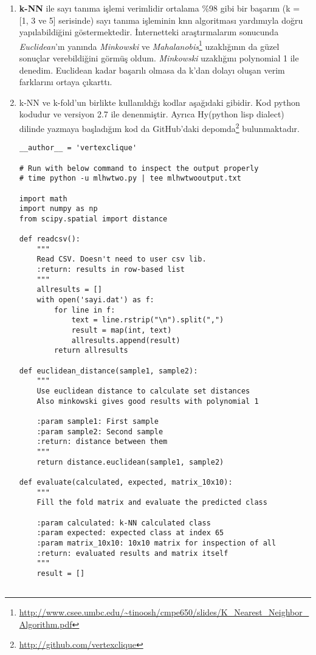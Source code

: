 \documentclass[11pt]{article}
\begin{document}
\begin{enumerate}[\indent a)]

\item
\textbf{k-NN} ile sayı tanıma işlemi verimlidir ortalama \%98 gibi bir başarım (k = [1, 3 ve 5] serisinde) sayı tanıma işleminin knn algoritması yardımıyla doğru yapılabildiğini göstermektedir. İnternetteki araştırmalarım sonucunda \textit{Euclidean}'ın yanında \textit{Minkowski} ve \textit{Mahalanobis}\footnote{\url{http://www.csee.umbc.edu/~tinoosh/cmpe650/slides/K_Nearest_Neighbor_Algorithm.pdf}} uzaklığının da güzel sonuçlar verebildiğini görmüş oldum. \textit{Minkowski} uzaklığını polynomial 1 ile denedim. Euclidean kadar başarılı olmasa da k'dan dolayı oluşan verim farklarını ortaya çıkarttı.

\item
k-NN ve k-fold'un birlikte kullanıldığı kodlar aşağıdaki gibidir. Kod python kodudur ve versiyon 2.7 ile denenmiştir. Ayrıca Hy(python lisp dialect) dilinde yazmaya başladığım kod da GitHub'daki depomda\footnote{\url{http://github.com/vertexclique}} bulunmaktadır.

\begin{verbatim}
__author__ = 'vertexclique'

# Run with below command to inspect the output properly
# time python -u mlhwtwo.py | tee mlhwtwooutput.txt

import math
import numpy as np
from scipy.spatial import distance

def readcsv():
    """
    Read CSV. Doesn't need to user csv lib.
    :return: results in row-based list
    """
    allresults = []
    with open('sayi.dat') as f:
        for line in f:
            text = line.rstrip("\n").split(",")
            result = map(int, text)
            allresults.append(result)
        return allresults

def euclidean_distance(sample1, sample2):
    """
    Use euclidean distance to calculate set distances
    Also minkowski gives good results with polynomial 1

    :param sample1: First sample
    :param sample2: Second sample
    :return: distance between them
    """
    return distance.euclidean(sample1, sample2)

def evaluate(calculated, expected, matrix_10x10):
    """
    Fill the fold matrix and evaluate the predicted class

    :param calculated: k-NN calculated class
    :param expected: expected class at index 65
    :param matrix_10x10: 10x10 matrix for inspection of all
    :return: evaluated results and matrix itself
    """
    result = []


\end{verbatim}
\end{enumerate}
\end{document}
